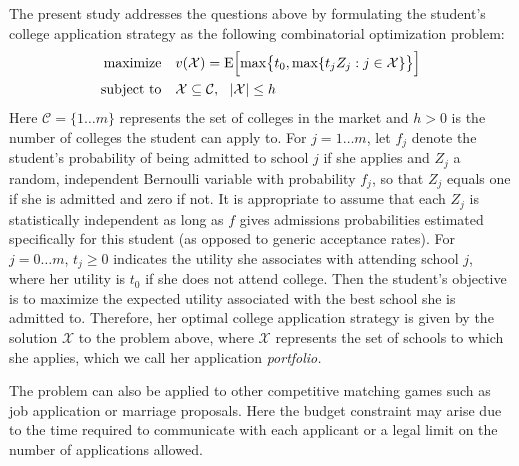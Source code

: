 The present study addresses the questions above by formulating the student's college application strategy as the following combinatorial optimization problem:
\begin{align} \label{headlineproblem}
\begin{split}
\text{maximize}\quad & v(\mathcal{X}) =  \operatorname{E}\Bigl[\max\bigr\{t_0,
\max\{t_j Z_j : j \in \mathcal{X}\}\bigr\}\Bigr] \\
\text{subject to}\quad & \mathcal{X} \subseteq \mathcal{C}, ~~|\mathcal{X}| \leq h
\end{split}
\end{align}
Here $\mathcal{C} = \{ 1 \dots m\}$ represents the set of colleges in the market and $h > 0$ is the number of colleges the student can apply to. For $j = 1 \dots m$, let $f_j$ denote the student's probability of being admitted to school $j$ if she applies and $Z_j$ a random, independent Bernoulli variable with probability $f_j$, so that $Z_j$ equals one if she is admitted and zero if not. It is appropriate to assume that each $Z_j$ is statistically independent as long as $f$ gives admissions probabilities estimated specifically for this student (as opposed to generic acceptance rates). For $j = 0\dots m$, $t_j\geq 0$ indicates the utility she associates with attending school $j$, where her utility is $t_0$ if she does not attend college. Then the student's objective is to maximize the expected utility associated with the best school she is admitted to. Therefore, her optimal college application strategy is given by the solution $\mathcal{X}$ to the problem above, where $\mathcal{X}$ represents the set of schools to which she applies, which we call her application \emph{portfolio.}

The problem can also be applied to other competitive matching games such as job application or marriage proposals. Here the budget constraint may arise due to the time required to communicate with each applicant or a legal limit on the number of applications allowed.

